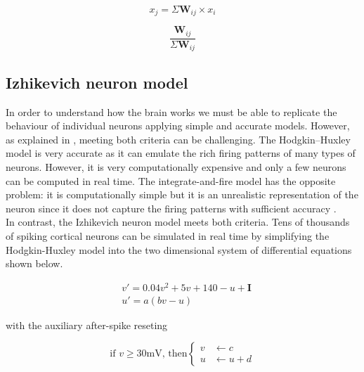 \documentclass[11pt]{article}
\begin{document}
\begin{equation}\label{eq:synaptic_effectivity}
x_{j} = \Sigma \textbf{W}_{ij}\times x_{i}
\end{equation}

\begin{equation}\label{eq:synaptic_contribution}
\frac{\textbf{W}_{ij}}{\Sigma \textbf{W}_{ij}}
\end{equation}

\subsection{Izhikevich neuron model}

In order to understand how the brain works we must be able to replicate the behaviour of individual neurons applying simple and accurate models. However, as explained in \cite{izhikevich2003simple}, meeting both criteria can be challenging. The Hodgkin–Huxley model \cite{hodgkin1952quantitative} is very accurate as it can emulate the rich firing patterns of many types of neurons. However, it is very computationally expensive and only a few neurons can be computed in real time. The integrate-and-fire model \cite{burkitt2006review}  has the opposite problem: it is computationally simple but it is an unrealistic representation of the neuron since it does not capture the firing patterns with sufficient accuracy \cite{izhikevich2003simple}.
\\
In contrast, the Izhikevich neuron model \cite{izhikevich2003simple} meets both criteria. Tens of thousands of spiking cortical neurons can be simulated in real time by simplifying the Hodgkin-Huxley model into the two dimensional system of differential equations shown below.


\begin{align}\label{eq:izhikevich_ode}
&v'=0.04v^{2}+5v+140-u+\textbf{I} \\
&u'=a(bv-u)
\end{align}

with the auxiliary after-spike reseting

\begin{equation}\label{eq:izhikevich_reset}
\text{if } v \geq 30 \text{mV, then}
\begin{cases}
    v     & \leftarrow c \\
    u     & \leftarrow u + d 
  \end{cases}
\end{equation}
\end{document}

